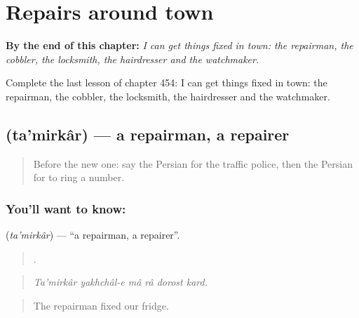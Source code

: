
\chapter{Repairs around town}
\label{ch:fa-repairs-around-town}

\begin{chapteropening}
\textbf{By the end of this chapter:} \emph{I can get things fixed in town: the repairman, the cobbler, the locksmith, the hairdresser and the watchmaker.}

Complete the last lesson of chapter 454: I can get things fixed in town: the repairman, the cobbler, the locksmith, the hairdresser and the watchmaker.
\end{chapteropening}

\section[\texorpdfstring{\fa{تعمیرکار} (ta'mirkâr)}{تعمیرکار (ta'mirkâr)}]{ (ta'mirkâr) — a repairman, a repairer}

\label{lesson:FA-C454-tamirkar}



\begin{quote}
Before the new one: say the Persian for the traffic police, then the Persian for to ring a number.
\end{quote}

\subsection*{You'll want to know: }
\textbf{} (\emph{ta'mirkâr}) — \textquotedblleft{}a repairman, a repairer\textquotedblright{}.

\begin{quote}
     .
\end{quote}

\begin{quote}
\emph{Ta'mirkâr yakhchâl-e mâ râ dorost kard.}
\end{quote}

\begin{quote}
The repairman fixed our fridge.
\end{quote}

